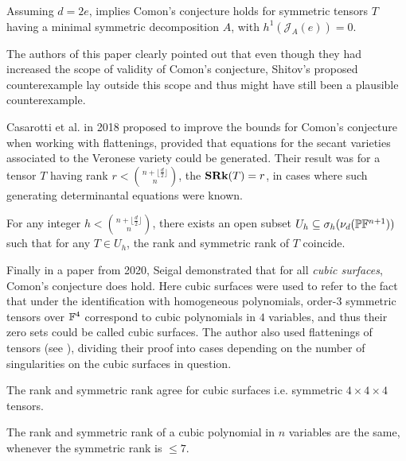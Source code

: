 \documentclass[../Lael_John_MasterThesis_Draft.tex]{subfiles}
\begin{document}
\begin{remark}
	Assuming $d = 2e$, implies Comon's conjecture holds for symmetric tensors $T$ having a minimal symmetric decomposition $A$, with $h^1(\mathcal{J}_A(e)) = 0$.
\end{remark}
 The authors of this paper clearly pointed out that even though they had increased the scope of validity of Comon's conjecture, Shitov's proposed counterexample \cite{shitov_counterexample_2018} lay outside this scope and thus might have still been a plausible counterexample.


Casarotti et al. \cite{casarotti_comons_2018} in 2018 proposed to improve the bounds for Comon's conjecture when working with flattenings, provided that equations for the secant varieties associated to the Veronese variety could be generated. Their result was for a tensor $T$ having rank $r < \binom{n + \lfloor \frac{d}{2} \rfloor}{n}$, the $\textbf{SRk}(T) = r$, in cases where such generating determinantal equations were known.
\begin{proposition}
	For any integer $h < \binom{n + \lfloor \frac{d}{2} \rfloor}{n}$, there exists an open subset $U_h \subseteq \sigma_h(\nu_d(\mathbb{P}\mathbb{F}^{n+1}))$ such that for any $T \in U_h$, the rank and symmetric rank of $T$ coincide.
\end{proposition}

Finally in a paper from 2020, Seigal \cite{seigal_ranks_2020} demonstrated that for all \textit{cubic surfaces}, Comon's conjecture does hold. Here cubic surfaces were used to refer to the fact that under the identification with homogeneous polynomials, order-$3$ symmetric tensors over $\mathbb{F}^4$ correspond to cubic polynomials in $4$ variables, and thus their zero sets could be called cubic surfaces. The author also used flattenings of tensors (see ), dividing their proof into cases depending on the number of singularities on the cubic surfaces in question.
\begin{theorem}
	The rank and symmetric rank agree for cubic surfaces i.e. symmetric $4 \times 4 \times 4$ tensors.
\end{theorem}
\begin{corollary}
	The rank and symmetric rank of a cubic polynomial in $n$ variables are the same, whenever the symmetric rank is $\leq 7$.
\end{corollary}
\end{document}
